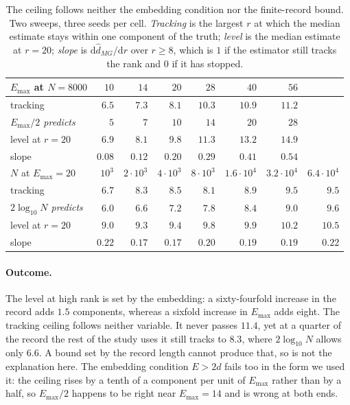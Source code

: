 \documentclass{article}
\begin{document}
\begin{table}[H]
\centering
\caption{The ceiling follows neither the embedding condition nor the finite-record bound. Two
sweeps, three seeds per cell. \emph{Tracking} is the largest $r$ at which the median
estimate stays within one component of the truth; \emph{level} is the median estimate at $r = 20$;
\emph{slope} is $\mathrm{d}\hat d_{MG}/\mathrm{d}r$ over $r \ge 8$, which is $1$ if the estimator
still tracks the rank and $0$ if it has stopped.}
\label{tab:ceiling}
\begin{tabular}{lrrrrrrr}
\toprule
$E_{\max}$ at $N = 8000$ & $10$ & $14$ & $20$ & $28$ & $40$ & $56$ & \\
\midrule
tracking & $6.5$ & $7.3$ & $8.1$ & $10.3$ & $10.9$ & $11.2$ & \\
\emph{$E_{\max}/2$ predicts} & $5$ & $7$ & $10$ & $14$ & $20$ & $28$ & \\
level at $r = 20$ & $6.9$ & $8.1$ & $9.8$ & $11.3$ & $13.2$ & $14.9$ & \\
slope & $0.08$ & $0.12$ & $0.20$ & $0.29$ & $0.41$ & $0.54$ & \\
\midrule
$N$ at $E_{\max} = 20$ & $10^3$ & $2\!\cdot\!10^3$ & $4\!\cdot\!10^3$ & $8\!\cdot\!10^3$ &
$1.6\!\cdot\!10^4$ & $3.2\!\cdot\!10^4$ & $6.4\!\cdot\!10^4$ \\
\midrule
tracking & $6.7$ & $8.3$ & $8.5$ & $8.1$ & $8.9$ & $9.5$ & $9.5$ \\
\emph{$2\log_{10}N$ predicts} & $6.0$ & $6.6$ & $7.2$ & $7.8$ & $8.4$ & $9.0$ & $9.6$ \\
level at $r = 20$ & $9.0$ & $9.3$ & $9.4$ & $9.8$ & $9.9$ & $10.2$ & $10.5$ \\
slope & $0.22$ & $0.17$ & $0.17$ & $0.20$ & $0.19$ & $0.19$ & $0.22$ \\
\bottomrule
\end{tabular}
\end{table}

\paragraph{Outcome.} The level at high rank is set by the embedding: a sixty-fourfold increase in
the record adds $1.5$ components, whereas a sixfold increase in $E_{\max}$ adds eight. The tracking
ceiling follows neither variable. It never passes $11.4$, yet at a quarter of the record the rest
of the study uses it still tracks to $8.3$, where $2\log_{10}N$ allows only $6.6$. A bound set by the
record length cannot produce that, so \citet{eckmann1992fundamental} is not the explanation here.
The embedding condition $E > 2d$ fails too in the form we used it: the ceiling rises by a tenth
of a component per unit of $E_{\max}$ rather than by a half, so $E_{\max}/2$ happens to be right
near $E_{\max} = 14$ and is wrong at both ends.
\end{document}
